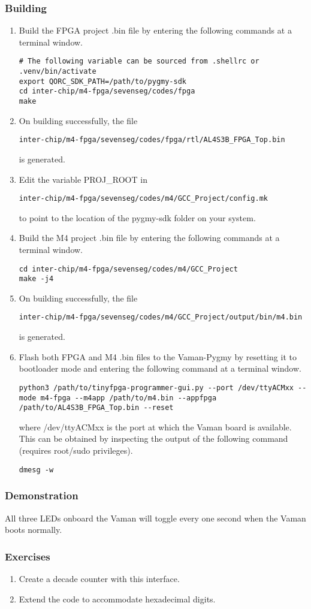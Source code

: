 \subsubsection{Building}
\begin{enumerate}
    \item Build the FPGA project .bin file by entering the following commands at
    a terminal window.
    \begin{lstlisting}
# The following variable can be sourced from .shellrc or .venv/bin/activate
export QORC_SDK_PATH=/path/to/pygmy-sdk
cd inter-chip/m4-fpga/sevenseg/codes/fpga
make
    \end{lstlisting}
    \item On building successfully, the file
    \begin{lstlisting}
inter-chip/m4-fpga/sevenseg/codes/fpga/rtl/AL4S3B_FPGA_Top.bin
    \end{lstlisting}
    is generated.
    \item Edit the variable PROJ\_ROOT in
    \begin{lstlisting}
inter-chip/m4-fpga/sevenseg/codes/m4/GCC_Project/config.mk
    \end{lstlisting}
    to point to the location of the pygmy-sdk folder on your system.
    \item Build the M4 project .bin file by entering the following commands at a
    terminal window.
    \begin{lstlisting}
cd inter-chip/m4-fpga/sevenseg/codes/m4/GCC_Project
make -j4
    \end{lstlisting}
    \item On building successfully, the file
    \begin{lstlisting}
inter-chip/m4-fpga/sevenseg/codes/m4/GCC_Project/output/bin/m4.bin
    \end{lstlisting}
    is generated.
    \item Flash both FPGA and M4 .bin files to the Vaman-Pygmy by resetting it
    to bootloader mode and entering the following command at a terminal window.
    \begin{lstlisting}
python3 /path/to/tinyfpga-programmer-gui.py --port /dev/ttyACMxx --mode m4-fpga --m4app /path/to/m4.bin --appfpga /path/to/AL4S3B_FPGA_Top.bin --reset
    \end{lstlisting}
    where /dev/ttyACMxx is the port at which the Vaman board is available. This
    can be obtained by inspecting the output of the following command (requires
    root/sudo privileges).
    \begin{lstlisting}
dmesg -w
    \end{lstlisting}
\end{enumerate}

\subsubsection{Demonstration}
All three LEDs onboard the Vaman will toggle every one second when the Vaman
boots normally.

\subsubsection{Exercises}
\begin{enumerate}
    \item Create a decade counter with this interface.
    \item Extend the code to accommodate hexadecimal digits.
\end{enumerate}